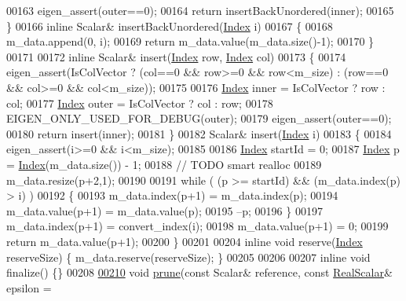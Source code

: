 \begin{DoxyCode}
00163       eigen\_assert(outer==0);
00164       \textcolor{keywordflow}{return} insertBackUnordered(inner);
00165     \}
00166     \textcolor{keyword}{inline} Scalar& insertBackUnordered(\hyperlink{group___core___module_a554f30542cc2316add4b1ea0a492ff02}{Index} i)
00167     \{
00168       m\_data.append(0, i);
00169       \textcolor{keywordflow}{return} m\_data.value(m\_data.size()-1);
00170     \}
00171 
00172     \textcolor{keyword}{inline} Scalar& insert(\hyperlink{group___core___module_a554f30542cc2316add4b1ea0a492ff02}{Index} row, \hyperlink{group___core___module_a554f30542cc2316add4b1ea0a492ff02}{Index} col)
00173     \{
00174       eigen\_assert(IsColVector ? (col==0 && row>=0 && row<m\_size) : (row==0 && col>=0 && col<m\_size));
00175       
00176       \hyperlink{group___core___module_a554f30542cc2316add4b1ea0a492ff02}{Index} inner = IsColVector ? row : col;
00177       \hyperlink{group___core___module_a554f30542cc2316add4b1ea0a492ff02}{Index} outer = IsColVector ? col : row;
00178       EIGEN\_ONLY\_USED\_FOR\_DEBUG(outer);
00179       eigen\_assert(outer==0);
00180       \textcolor{keywordflow}{return} insert(inner);
00181     \}
00182     Scalar& insert(\hyperlink{group___core___module_a554f30542cc2316add4b1ea0a492ff02}{Index} i)
00183     \{
00184       eigen\_assert(i>=0 && i<m\_size);
00185       
00186       \hyperlink{group___core___module_a554f30542cc2316add4b1ea0a492ff02}{Index} startId = 0;
00187       \hyperlink{group___core___module_a554f30542cc2316add4b1ea0a492ff02}{Index} p = \hyperlink{namespace_eigen_a62e77e0933482dafde8fe197d9a2cfde}{Index}(m\_data.size()) - 1;
00188       \textcolor{comment}{// TODO smart realloc}
00189       m\_data.resize(p+2,1);
00190 
00191       \textcolor{keywordflow}{while} ( (p >= startId) && (m\_data.index(p) > i) )
00192       \{
00193         m\_data.index(p+1) = m\_data.index(p);
00194         m\_data.value(p+1) = m\_data.value(p);
00195         --p;
00196       \}
00197       m\_data.index(p+1) = convert\_index(i);
00198       m\_data.value(p+1) = 0;
00199       \textcolor{keywordflow}{return} m\_data.value(p+1);
00200     \}
00201 
00204     \textcolor{keyword}{inline} \textcolor{keywordtype}{void} reserve(\hyperlink{group___core___module_a554f30542cc2316add4b1ea0a492ff02}{Index} reserveSize) \{ m\_data.reserve(reserveSize); \}
00205 
00206 
00207     \textcolor{keyword}{inline} \textcolor{keywordtype}{void} finalize() \{\}
00208 
\hyperlink{group___sparse_core___module_af094e30271da69f865b5d97f338f81d1}{00210}     \textcolor{keywordtype}{void} \hyperlink{group___sparse_core___module_af094e30271da69f865b5d97f338f81d1}{prune}(\textcolor{keyword}{const} Scalar& reference, \textcolor{keyword}{const} \hyperlink{group___sparse_core___module_aaec8ace6efb785c81d442931c3248d88}{RealScalar}& epsilon = 

\end{DoxyCode}
